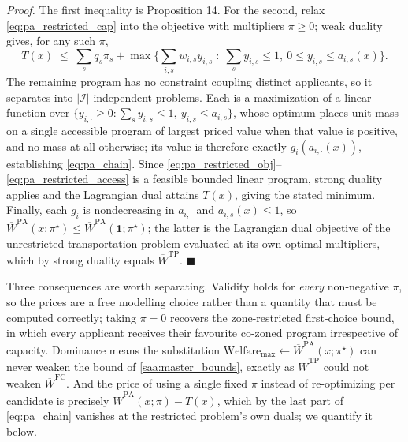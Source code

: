 \documentclass{article}
\begin{document}
\textit{Proof.} The first inequality is Proposition 14. For the second, relax \eqref{eq:pa_restricted_cap} into the objective with multipliers $\pi \geq 0$; weak duality gives, for any such $\pi$,
$$T(x) \;\leq\; \sum_{s} q_s \pi_s + \max\Big\{ \textstyle\sum_{i,s} w_{i,s} y_{i,s} \;:\; \sum_s y_{i,s} \leq 1, \ 0 \leq y_{i,s} \leq a_{i,s}(x) \Big\}.$$
The remaining program has no constraint coupling distinct applicants, so it separates into $|\mathcal{I}|$ independent problems. Each is a maximization of a linear function over $\{y_{i, \cdot} \geq 0 : \sum_s y_{i,s} \leq 1, \ y_{i,s} \leq a_{i,s}\}$, whose optimum places unit mass on a single accessible program of largest priced value when that value is positive, and no mass at all otherwise; its value is therefore exactly $g_i(a_{i, \cdot}(x))$, establishing \eqref{eq:pa_chain}. Since \eqref{eq:pa_restricted_obj}--\eqref{eq:pa_restricted_access} is a feasible bounded linear program, strong duality applies and the Lagrangian dual attains $T(x)$, giving the stated minimum. Finally, each $g_i$ is nondecreasing in $a_{i, \cdot}$ and $a_{i,s}(x) \leq 1$, so $\overline{W}^{\mathrm{PA}}(x; \pi^\star) \leq \overline{W}^{\mathrm{PA}}(\mathbf{1}; \pi^\star)$; the latter is the Lagrangian dual objective of the unrestricted transportation problem evaluated at its own optimal multipliers, which by strong duality equals $\overline{W}^{\mathrm{TP}}$. $\blacksquare$

Three consequences are worth separating. Validity holds for \emph{every} non-negative $\pi$, so the prices are a free modelling choice rather than a quantity that must be computed correctly; taking $\pi = 0$ recovers the zone-restricted first-choice bound, in which every applicant receives their favourite co-zoned program irrespective of capacity. Dominance means the substitution $\text{Welfare}_{\max} \leftarrow \overline{W}^{\mathrm{PA}}(x; \pi^\star)$ can never weaken the bound of \eqref{saa:master_bounds}, exactly as $\overline{W}^{\mathrm{TP}}$ could not weaken $\overline{W}^{\mathrm{FC}}$. And the price of using a single fixed $\pi$ instead of re-optimizing per candidate is precisely $\overline{W}^{\mathrm{PA}}(x; \pi) - T(x)$, which by the last part of \eqref{eq:pa_chain} vanishes at the restricted problem's own duals; we quantify it below.
\end{document}

